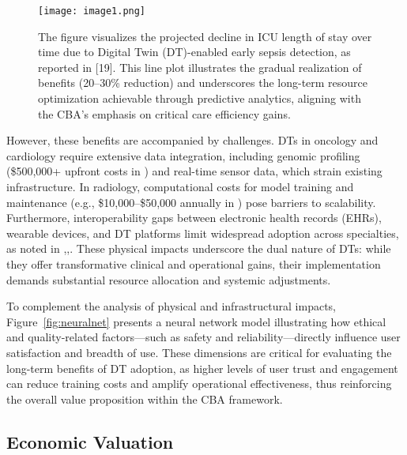 \documentclass[10pt,a4paper]{article}
\begin{document}
\begin{figure} [H]
    \centering
    \texttt{[image: image1.png]}
    \caption{The figure visualizes the projected decline in ICU length of stay over time due to Digital Twin (DT)-enabled early sepsis detection, as reported in [19]. This line plot illustrates the gradual realization of benefits (20–30\% reduction) and underscores the long-term resource optimization achievable through predictive analytics, aligning with the CBA’s emphasis on critical care efficiency gains.}
    \label{fig:plot1}
\end{figure}

However, these benefits are accompanied by challenges. DTs in oncology and cardiology require extensive data integration, including genomic profiling (\$500,000+ upfront costs in \cite{Wang2025}) and real-time sensor data, which strain existing infrastructure. In radiology, computational costs for model training and maintenance (e.g., \$10,000–\$50,000 annually in \cite{Bocean2025}) pose barriers to scalability. Furthermore, interoperability gaps between electronic health records (EHRs), wearable devices, and DT platforms limit widespread adoption across specialties, as noted in \cite{Mascret2024},\cite{Ahmed2023},\cite{Bocean2025}. These physical impacts underscore the dual nature of DTs: while they offer transformative clinical and operational gains, their implementation demands substantial resource allocation and systemic adjustments.

To complement the analysis of physical and infrastructural impacts, Figure~\ref{fig:neuralnet} presents a neural network model illustrating how ethical and quality-related factors—such as safety and reliability—directly influence user satisfaction and breadth of use. These dimensions are critical for evaluating the long-term benefits of DT adoption, as higher levels of user trust and engagement can reduce training costs and amplify operational effectiveness, thus reinforcing the overall value proposition within the CBA framework.

\subsection*{Economic Valuation}
\end{document}
